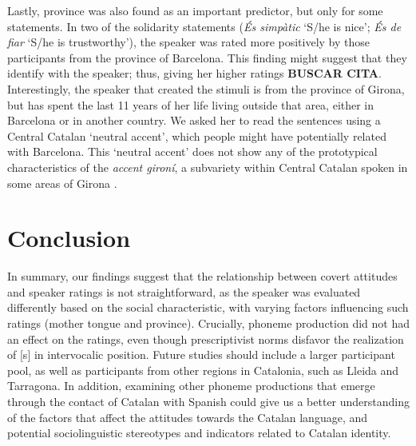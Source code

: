 \documentclass[
  a4paper,
  11pt,
  twocolumn]{article}
\begin{document}
Lastly, province was also found as an important predictor, but only for
some statements. In two of the solidarity statements (\emph{És simpàtic}
`S/he is nice'; \emph{És de fiar} `S/he is trustworthy'), the speaker
was rated more positively by those participants from the province of
Barcelona. This finding might suggest that they identify with the
speaker; thus, giving her higher ratings \textbf{BUSCAR CITA}.
Interestingly, the speaker that created the stimuli is from the province
of Girona, but has spent the last 11 years of her life living outside
that area, either in Barcelona or in another country. We asked her to
read the sentences using a Central Catalan `neutral accent', which
people might have potentially related with Barcelona. This `neutral
accent' does not show any of the prototypical characteristics of the
\emph{accent gironí}, a subvariety within Central Catalan spoken in some
areas of Girona \cite{gros_2024}.

\section{Conclusion}

In summary, our findings suggest that the relationship between covert
attitudes and speaker ratings is not straightforward, as the speaker was
evaluated differently based on the social characteristic, with varying
factors influencing such ratings (mother tongue and province).
Crucially, phoneme production did not had an effect on the ratings, even
though prescriptivist norms disfavor the realization of {[}s{]} in
intervocalic position. Future studies should include a larger
participant pool, as well as participants from other regions in
Catalonia, such as Lleida and Tarragona. In addition, examining other
phoneme productions that emerge through the contact of Catalan with
Spanish could give us a better understanding of the factors that affect
the attitudes towards the Catalan language, and potential
sociolinguistic stereotypes and indicators related to Catalan identity.



\end{document}
